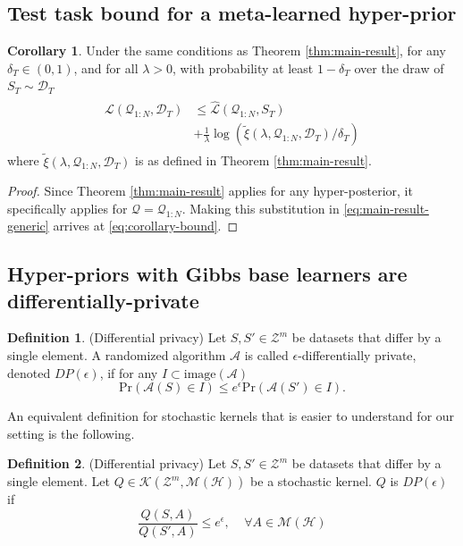 \documentclass[letterpaper]{article} %
\theoremstyle{definition}
\newtheorem{defn}{Definition}[section]
\newtheorem{corollary}[theorem]{Corollary}
\begin{document}
\subsection{Test task bound for a meta-learned hyper-prior} \label{append:corollary-bound}
\begin{corollary} \label{thm:corollary-base}
	Under the same conditions as Theorem \ref{thm:main-result},
	for any $\delta_T \in (0,1)$, and for all $\lambda>0$, with probability at least $1-\delta_T$ over the draw of $S_T\sim \mathcal{D}_T$
%	
    \begin{align} \label{eq:corollary-bound}
    \begin{split}
    \mathcal{L}(\mathcal{Q}_{1:N}, \mathcal{D}_T) &\leq \hat{\mathcal{L}}(\mathcal{Q}_{1:N}, S_T)\\
	&+\frac{1}{\lambda}\log\left (\tilde{\xi}(\lambda,\mathcal{Q}_{1:N},\mathcal{D}_T)/\delta_T\right )
    \end{split}
    \end{align}
	where $\tilde{\xi}(\lambda,\mathcal{Q}_{1:N},\mathcal{D}_T)$ is as defined in  Theorem \ref{thm:main-result}.
\end{corollary}
%
\begin{proof}
    Since Theorem \ref{thm:main-result} applies for any hyper-posterior, it specifically applies for $\mathcal{Q}=\mathcal{Q}_{1:N}$.
    Making this substitution in \eqref{eq:main-result-generic} arrives at \eqref{eq:corollary-bound}.
\end{proof}

\subsection{Hyper-priors with Gibbs base learners are differentially-private} \label{append:proof-dp}

\begin{defn} (Differential privacy) \citep{Dwork2006}
	Let $S,S'\in \mathcal{Z}^m$ be datasets that differ by a single element.
	A randomized algorithm $\mathcal{A}$ is called  $\epsilon$-differentially private, denoted $DP(\epsilon)$, if for any $I\subset \mathrm{image}(\mathcal{A})$
%	
	$$
	\mathrm{Pr}(\mathcal{A}(S)\in I)\leq e^\epsilon \mathrm{Pr}(\mathcal{A}(S')\in I) .
	$$
\end{defn}\label{def:diff_privacy}

An equivalent definition for stochastic kernels that is easier to understand for our setting is the following. 
%
\begin{defn} (Differential privacy)
	Let $S,S'\in \mathcal{Z}^m$ be datasets that differ by a single element.
	Let $Q\in \mathcal{K}(\mathcal{Z}^m, \mathcal{M}(\mathcal{H}))$ be a stochastic kernel.
	$Q$ is $DP(\epsilon)$ if 
%	
	$$\frac{Q(S, A)}{Q(S', A)} \leq e^\epsilon, \;\;\;\; \forall A\in  \mathcal{M}(\mathcal{H})$$
\end{defn}
\end{document}
